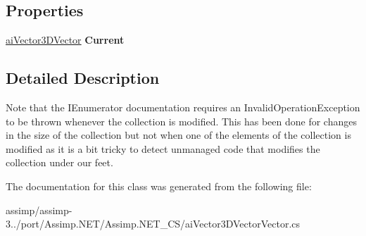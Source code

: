 \subsection*{Properties}
\begin{DoxyCompactItemize}
\item 
\hypertarget{classai_vector3_d_vector_vector_1_1ai_vector3_d_vector_vector_enumerator_a5d803377636765274455f13fb64cdf18}{\hyperlink{classai_vector3_d_vector}{ai\+Vector3\+D\+Vector} {\bfseries Current}}\label{classai_vector3_d_vector_vector_1_1ai_vector3_d_vector_vector_enumerator_a5d803377636765274455f13fb64cdf18}

\end{DoxyCompactItemize}


\subsection{Detailed Description}
Note that the I\+Enumerator documentation requires an Invalid\+Operation\+Exception to be thrown whenever the collection is modified. This has been done for changes in the size of the collection but not when one of the elements of the collection is modified as it is a bit tricky to detect unmanaged code that modifies the collection under our feet. 

The documentation for this class was generated from the following file\+:\begin{DoxyCompactItemize}
\item 
assimp/assimp-\/3../port/\+Assimp.\+N\+E\+T/\+Assimp.\+N\+E\+T\+\_\+\+C\+S/ai\+Vector3\+D\+Vector\+Vector.\+cs\end{DoxyCompactItemize}
